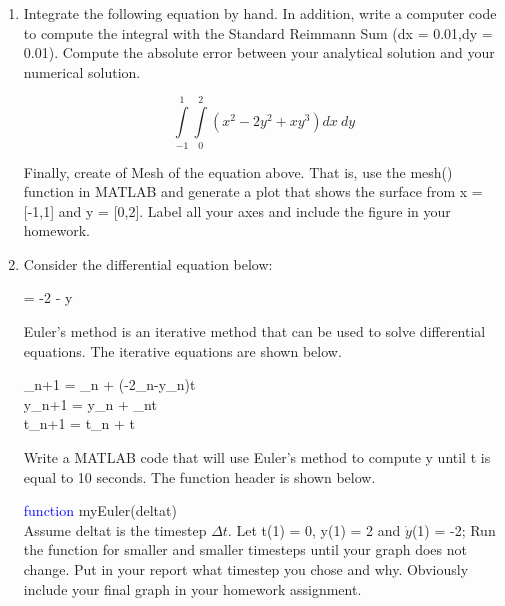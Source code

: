 \begin{enumerate}
\item Integrate the following equation by hand. In addition, write a
  computer code to compute the integral with the 
  Standard Reimmann Sum (dx = 0.01,dy = 0.01). Compute the absolute
  error between your analytical solution and your numerical solution.

\begin{equation}
\int\limits_{-1}^1\int\limits_{0}^{2}(x^2-2y^2+xy^3)dx~dy
\end{equation}

  Finally, create of Mesh of the equation above. That is, use the
  mesh() function in MATLAB and generate a plot
  that shows the surface from x = [-1,1] and y = [0,2]. Label all your
  axes and include the figure in your homework.

\item Consider the differential equation below:

  \beq
   = -2 - y
  \eeq

  Euler's method is an iterative method that can be used to solve
  differential equations. The iterative equations are shown below.

  \beq
  \beqn
  _{n+1} = _{n} + (-2_n-y_n)\Delta t \\
  y_{n+1} = y_{n} + _n\Delta t \\
  t_{n+1} = t_{n} + \Delta t
  \eeqn
  \eeq

  Write a MATLAB code that will use Euler's method to compute y until
  t is equal to 10 seconds. The function header is shown below. 

  \textcolor{blue}{function} myEuler(deltat)\\

  Assume deltat is the timestep $\Delta t$. Let t(1) = 0, y(1) = 2 and
  $\dot{y}$(1) = -2; Run the function for smaller and smaller timesteps until your graph
  does not change. Put in your report what timestep you chose and
  why. Obviously include your final graph in your homework assignment.

\end{enumerate}

